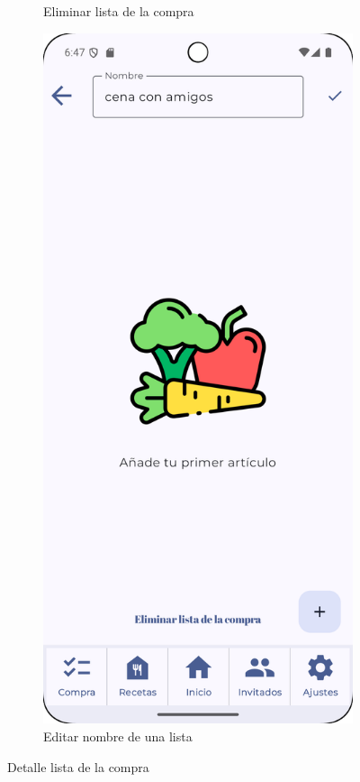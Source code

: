 \begin{figure}[H]
\begin{subfigure}[b]{0.3\textwidth}
      \caption{Eliminar lista de la compra}
      \label{fig:confirm-delete-list}
    \end{subfigure}
    \hfill
    \begin{subfigure}[b]{0.3\textwidth}
      \includegraphics[width=\textwidth]{./img/manual/edit_shopping_list_name.png}
      \caption{Editar nombre de una lista}
      \label{fig:change-list-name}
    \end{subfigure}

    \caption{Detalle lista de la compra}
    \label{fig:shopping-lists-detail}
\end{figure}

